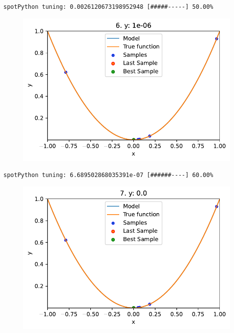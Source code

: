 \documentclass[
  letterpaper,
  DIV=11,
  numbers=noendperiod]{scrreprt}
\begin{document}
\begin{verbatim}
spotPython tuning: 0.0026120673198952948 [#####-----] 50.00% 
\end{verbatim}

\begin{figure}[H]

{\centering \includegraphics{010_num_spot_sklearn_surrogate_files/figure-pdf/cell-25-output-6.pdf}

}

\end{figure}

\begin{verbatim}
spotPython tuning: 6.689502868035391e-07 [######----] 60.00% 
\end{verbatim}

\begin{figure}[H]

{\centering \includegraphics{010_num_spot_sklearn_surrogate_files/figure-pdf/cell-25-output-8.pdf}

}

\end{figure}
\end{document}

